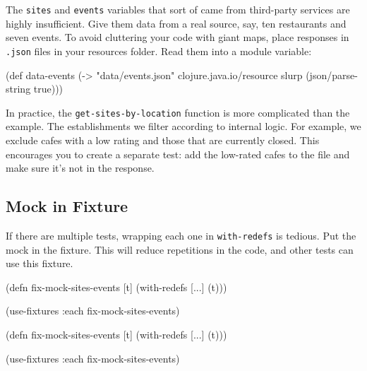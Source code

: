 The \verb|sites| and \verb|events| variables that sort of came from third-party services are highly insufficient. Give them data from a real source, say, ten restaurants and seven events. To avoid cluttering your code with giant maps, place responses in \verb|.json| files in your resources folder. Read them into a module variable:


\begin{english}
  \begin{clojure}
(def data-events
  (-> "data/events.json"
      clojure.java.io/resource
      slurp
      (json/parse-string true)))
  \end{clojure}
\end{english}


In practice, the \verb|get-sites-by-location| function is more complicated than the example. The establishments we filter according to internal logic. For example, we exclude cafes with a low rating and those that are currently closed. This encourages you to create a separate test: add the low-rated cafes to the file and make sure it's not in the response.

\subsection{Mock in Fixture}


If there are multiple tests, wrapping each one in \verb|with-redefs| is tedious. Put the mock in the fixture. This will reduce repetitions in the code, and other tests can use this fixture.

\ifnarrow

\begin{english}
  \begin{clojure}
(defn fix-mock-sites-events [t]
  (with-redefs [...]
    (t)))

(use-fixtures :each
  fix-mock-sites-events)
  \end{clojure}
\end{english}

\else

\begin{english}
  \begin{clojure}
(defn fix-mock-sites-events [t]
  (with-redefs [...]
    (t)))

(use-fixtures :each fix-mock-sites-events)
  \end{clojure}
\end{english}

